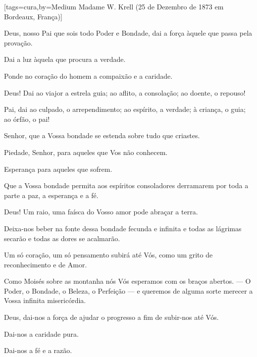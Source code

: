 \begin{songs}{}
      \sclearpage
      [tags={cura},by={Medium Madame W. Krell (25 de Dezembro de 1873 em Bordeaux, França)}]
        \begin{passage}[PT]{}
          Deus, nosso Pai que sois todo Poder e Bondade, dai
          a força àquele que passa pela provação.
          \par
          Dai a luz àquela que procura a verdade.
          \par
          Ponde no coração do homem a compaixão e a caridade.
          \par
          Deus! Dai ao viajor a estrela guia; ao aflito,
          a consolação; ao doente, o repouso!
          \par
          Pai, dai ao culpado, o arrependimento; ao espírito,
          a verdade; à criança, o guia; ao órfão, o pai!
          \par
          Senhor, que a Vossa bondade se estenda sobre tudo
          que criastes.
          \par
          Piedade, Senhor, para aqueles que Vos não conhecem.
          \par
          Esperança para aqueles que sofrem.
          \par
          Que a Vossa bondade permita aos espíritos
          consoladores derramarem por toda a parte a paz, a
          esperança e a fé.
          \par
          Deus! Um raio, uma faísca do Vosso amor pode abraçar
          a terra.
          \par
          Deixa-nos beber na fonte dessa bondade fecunda
          e infinita e todas as lágrimas secarão e todas as
          dores se acalmarão.
          \par
          Um só coração, um só pensamento subirá até Vós,
          como um grito de reconhecimento e de Amor.
          \par
          Como Moisés sobre as montanha nós Vós esperamos
          com os braços abertos. ---
          O Poder, o Bondade, o Beleza, o Perfeição ---
          e queremos de alguma sorte merecer a Vossa infinita
          misericórdia.
          \par
          Deus, dai-nos a força de ajudar o progresso a fim
          de subir-nos até Vós.
          \par
          Dai-nos a caridade pura.
          \par
          Dai-nos a fé e a razão.
          \par

\end{passage}
\end{songs}
